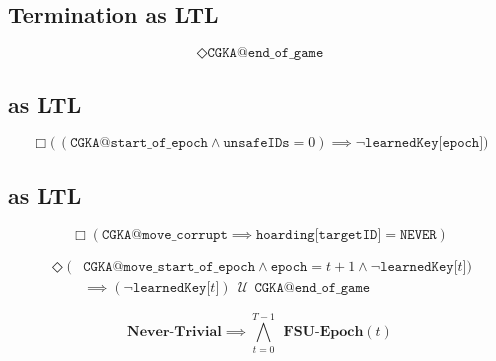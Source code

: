 \hypertarget{hlt-as-ltl}{%
\subsection{Termination as LTL}\label{hlt-as-ltl}}

\begin{LTL}
    $$
    \Diamond \texttt{CGKA@end\_of\_game}
    $$
\end{LTL}

\hypertarget{pcs-as-ltl}{%
\subsection{ as LTL}\label{pcs-as-ltl}}

\begin{LTL}
    $$
    \Box \Big(\, ( \texttt{CGKA@start\_of\_epoch} \land \texttt{unsafeIDs} = 0 ) \implies \neg \texttt{learnedKey[epoch]} \Big)
    $$
\end{LTL}


\hypertarget{fsu-as-ltl}{%
\subsection{ as LTL}\label{fsu-as-ltl}}

\begin{LTL}
    $$
    \Box \left( \texttt{CGKA@move\_corrupt} \implies \texttt{hoarding[targetID]} = \texttt{NEVER} \right)
    $$
\end{LTL}

\begin{LTL}
    \begin{equation*}
    \begin{split}
    \Diamond ( & \texttt{CGKA@move\_start\_of\_epoch} \land \texttt{epoch} = t + 1 \land \neg \texttt{learnedKey[$t$]} ) \\
    & \implies ( \neg \texttt{learnedKey[$t$]} ) \,\;{\mathcal {U}}\;\, \texttt{CGKA@end\_of\_game}
    \end{split}
    \end{equation*}
\end{LTL}

\begin{LTL}
    $$
    \textbf{Never-Trivial} \implies \bigwedge\limits_{t=0}^{T-1} \;\,\textbf{FSU-Epoch}(t)
    $$
\end{LTL}
